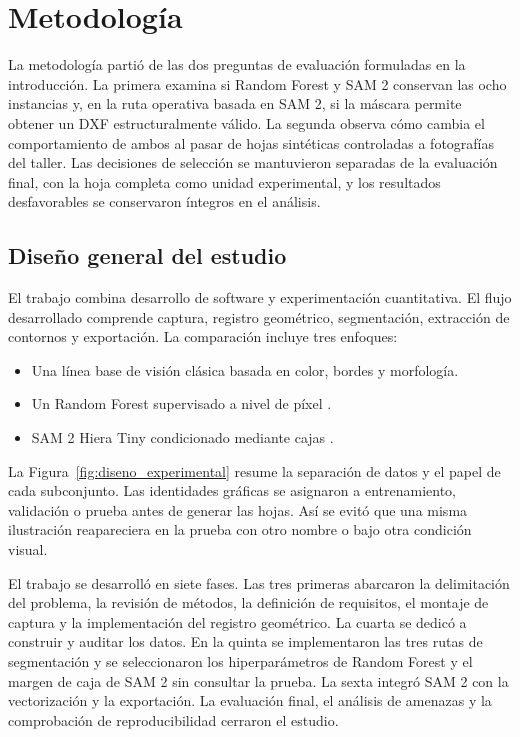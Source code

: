 \chapter{Metodología}
\label{cap:metodologia}

La metodología partió de las dos preguntas de evaluación formuladas en la introducción. La primera examina si Random Forest y SAM 2 conservan las ocho instancias y, en la ruta operativa basada en SAM 2, si la máscara permite obtener un DXF estructuralmente válido. La segunda observa cómo cambia el comportamiento de ambos al pasar de hojas sintéticas controladas a fotografías del taller. Las decisiones de selección se mantuvieron separadas de la evaluación final, con la hoja completa como unidad experimental, y los resultados desfavorables se conservaron íntegros en el análisis.

\section{Diseño general del estudio}

El trabajo combina desarrollo de software y experimentación cuantitativa. El flujo desarrollado comprende captura, registro geométrico, segmentación, extracción de contornos y exportación. La comparación incluye tres enfoques:

\begin{itemize}
    \item Una línea base de visión clásica basada en color, bordes y morfología.
    \item Un Random Forest supervisado a nivel de píxel \cite{Breiman2001}.
    \item SAM 2 Hiera Tiny condicionado mediante cajas \cite{Ravi2025}.
\end{itemize}

La Figura~\ref{fig:diseno_experimental} resume la separación de datos y el papel de cada subconjunto. Las identidades gráficas se asignaron a entrenamiento, validación o prueba antes de generar las hojas. Así se evitó que una misma ilustración reapareciera en la prueba con otro nombre o bajo otra condición visual.


El trabajo se desarrolló en siete fases. Las tres primeras abarcaron la delimitación del problema, la revisión de métodos, la definición de requisitos, el montaje de captura y la implementación del registro geométrico. La cuarta se dedicó a construir y auditar los datos. En la quinta se implementaron las tres rutas de segmentación y se seleccionaron los hiperparámetros de Random Forest y el margen de caja de SAM 2 sin consultar la prueba. La sexta integró SAM 2 con la vectorización y la exportación. La evaluación final, el análisis de amenazas y la comprobación de reproducibilidad cerraron el estudio.

